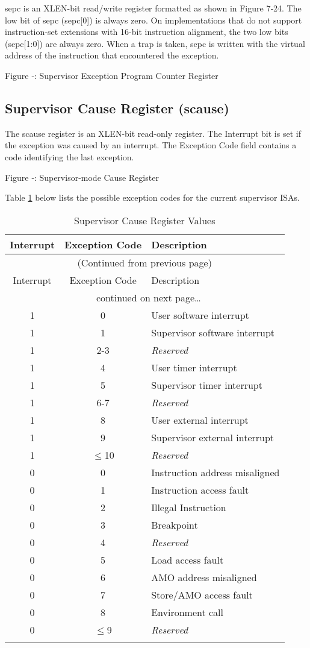 sepc is an XLEN-bit read/write register formatted as shown in Figure
7‑24. The low bit of sepc (sepc{[}0{]}) is always zero. On
implementations that do not support instruction-set extensions with
16-bit instruction alignment, the two low bits (sepc{[}1:0{]}) are
always zero. When a trap is taken, sepc is written with the virtual
address of the instruction that encountered the exception.

\missingfigure{}

\protect\hypertarget{_Ref367098363}{}{}Figure ‑: Supervisor Exception
Program Counter Register

\subsection{Supervisor Cause Register (scause)
}\label{supervisor-cause-register-scause}

The scause register is an XLEN-bit read-only register. The Interrupt bit
is set if the exception was caused by an interrupt. The Exception Code
field contains a code identifying the last exception.

\missingfigure{}

Figure ‑: Supervisor-mode Cause Register

Table \ref{tab:scause-reg-values} below lists the possible exception codes for the current supervisor ISAs.

\begin{longtable}[]{@{}ccl@{}}
\toprule
Interrupt & Exception Code & Description\tabularnewline
\midrule
\endfirsthead
\multicolumn{3}{c}{{(Continued from previous page)}} \\

\toprule
Interrupt & Exception Code & Description\tabularnewline
\midrule
\endhead

\midrule \multicolumn{3}{c}{{\tablename\ \thetable{} continued on next page\ldots}} \\
\endfoot

\endlastfoot

1 & 0 & User software interrupt\tabularnewline
1 & 1 & Supervisor software interrupt\tabularnewline
1 & 2-3 & \emph{Reserved}\tabularnewline
1 & 4 & User timer interrupt\tabularnewline
1 & 5 & Supervisor timer interrupt\tabularnewline
1 & 6-7 & \emph{Reserved}\tabularnewline
1 & 8 & User external interrupt\tabularnewline
1 & 9 & Supervisor external interrupt\tabularnewline
1 & $\leqslant$10 & \emph{Reserved}\tabularnewline
\midrule
0 & 0 & Instruction address misaligned\tabularnewline
0 & 1 & Instruction access fault\tabularnewline
0 & 2 & Illegal Instruction\tabularnewline
0 & 3 & Breakpoint\tabularnewline
0 & 4 & \emph{Reserved}\tabularnewline
0 & 5 & Load access fault\tabularnewline
0 & 6 & AMO address misaligned\tabularnewline
0 & 7 & Store/AMO access fault\tabularnewline
0 & 8 & Environment call\tabularnewline
0 & $\leqslant$9 & \emph{Reserved}\tabularnewline
\bottomrule
\caption{Supervisor Cause Register Values}
\label{tab:scause-reg-values}
\end{longtable}

